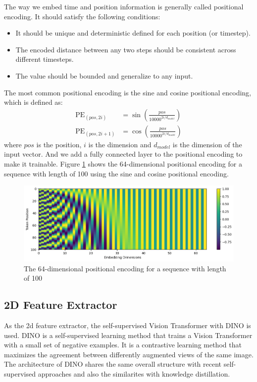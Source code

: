 \documentclass[12pt,DIV14,BCOR12mm,a4paper,footinclude=false,headinclude,parskip=half-,twoside,openright,cleardoublepage=empty,toc=index,bibliography=totoc,listof=totoc]{scrreprt}
\numberwithin{equation}{chapter}
\begin{document}
The way we embed time and position information is generally called positional encoding. It should satisfy the following conditions\cite{kazemnejad2019:pencoding}:
\begin{itemize}
  \item It should be unique and deterministic defined for each position (or timestep).
  \item The encoded distance between any two steps should be consistent across different timesteps.
  \item The value should be bounded and generalize to any input.
\end{itemize}
The most common positional encoding is the sine and cosine positional encoding\cite{vaswani2023attention}, which is defined as:
\begin{align}
  \text{PE}_{(pos, 2i)} &= \sin\left(\frac{pos}{10000^{2i/d_{model}}}\right)\\
  \text{PE}_{(pos, 2i+1)} &= \cos\left(\frac{pos}{10000^{2i/d_{model}}}\right)
\end{align}
where $pos$ is the position, $i$ is the dimension and $d_{model}$ is the dimension of the input vector. And we add a fully connected layer to the positional encoding to make it trainable. Figure \ref{img:pe} shows the 64-dimensional positional encoding for a sequence with length of 100 using the sine and cosine positional encoding.
\begin{figure}[h]
	\centering
	\includegraphics[scale=.65]{img/pe.png}
	\caption{The 64-dimensional positional encoding for a sequence with length of 100}
	\label{img:pe}
\end{figure}

\subsection{2D Feature Extractor}
As the \gls{2d} feature extractor, the self-supervised Vision Transformer
 with DINO\cite{caron2021emerging} is used. DINO is a self-supervised learning method that trains a Vision Transformer
 with a small set of negative examples. It is a contrastive learning method that maximizes the agreement between differently augmented views of the same image. The architecture of DINO shares the same overall structure with recent self-supervised approaches and also the similarites with knowledge distillation.
\end{document}
